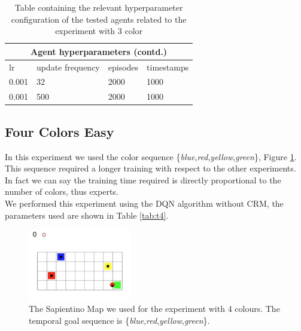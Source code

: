 \documentclass{article}
\begin{document}
\begin{table}[h!]
\centering
\begin{tabular}{||p{0.8cm}|p{1cm}|p{1.2cm}|p{1.7cm}|}
 \hline
 \multicolumn{4}{|c|}{Agent hyperparameters (contd.)} \\
 \hline
lr & update frequency & episodes & timestamps\\
 \hline
 0.001 & 32 & 2000 & 1000 \\
  \hline
  0.001 & 500 & 2000 & 1000 \\
\hline
\end{tabular}
\caption{Table containing the relevant hyperparameter configuration of the tested agents related to the experiment with 3 color}\label{tab:t3}
\end{table}


\subsection{Four Colors Easy} %
In this experiment we used the color sequence \{\textit{blue},\textit{red},\textit{yellow},\textit{green}\}, Figure \ref{fig:m4c}. This sequence required a longer training with respect to the other experiments. In fact we can say the training time required is directly proportional to the number of colors, thus experts. \\
We performed this experiment using the DQN algorithm without CRM, the parameters used are shown in Table \ref{tab:t4}.
\begin{figure}[h!]
  \centering
  \includegraphics[width=0.4\textwidth]{images/map4_easy.png}
  \caption{The Sapientino Map we used for the experiment with 4 colours. The temporal goal sequence is \{\textit{blue},\textit{red},\textit{yellow},\textit{green}\}.}\label{fig:m4c}
\end{figure}
\end{document}
